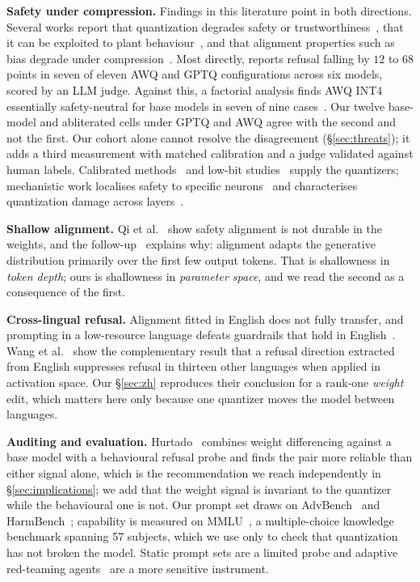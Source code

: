 \documentclass[conference,compsoc,letterpaper]{IEEEtran}
\begin{document}
\textbf{Safety under compression.} Findings in this literature point in both directions. Several works report that quantization degrades safety or trustworthiness~\cite{quantsafety2025,compressedtrust2024,finetunequant2024}, that it can be exploited to plant behaviour~\cite{exploitquant2024}, and that alignment properties such as bias degrade under compression~\cite{bias2026}. Most directly, \cite{qualitynotproxy2026} reports refusal falling by $12$ to $68$ points in seven of eleven AWQ and GPTQ configurations across six models, scored by an LLM judge. Against this, a factorial analysis finds AWQ INT4 essentially safety-neutral for base models in seven of nine cases~\cite{jointtemp2026}. Our twelve base-model and abliterated cells under GPTQ and AWQ agree with the second and not the first. Our cohort alone cannot resolve the disagreement (\S\ref{sec:threats}); it adds a third measurement with matched calibration and a judge validated against human labels. Calibrated methods~\cite{gptq2022,awq2023} and low-bit studies~\cite{qlora2023,lowbitllama3,bf16ordeath2024,kldquant2026} supply the quantizers; mechanistic work localises safety to specific neurons~\cite{safetyneurons2024} and characterises quantization damage across layers~\cite{structure2026}.

\textbf{Shallow alignment.} Qi et al.~\cite{qi2024finetuning} show safety alignment is not durable in the weights, and the follow-up~\cite{qi2025shallow} explains why: alignment adapts the generative distribution primarily over the first few output tokens. That is shallowness in \emph{token depth}; ours is shallowness in \emph{parameter space}, and we read the second as a consequence of the first.

\textbf{Cross-lingual refusal.} Alignment fitted in English does not fully transfer, and prompting in a low-resource language defeats guardrails that hold in English~\cite{yong2023lowresource,deng2024multilingual}. Wang et al.~\cite{wang2025universal} show the complementary result that a refusal direction extracted from English suppresses refusal in thirteen other languages when applied in activation space. Our \S\ref{sec:zh} reproduces their conclusion for a rank-one \emph{weight} edit, which matters here only because one quantizer moves the model between languages.

\textbf{Auditing and evaluation.} Hurtado~\cite{hurtado2026audit} combines weight differencing against a base model with a behavioural refusal probe and finds the pair more reliable than either signal alone, which is the recommendation we reach independently in \S\ref{sec:implications}; we add that the weight signal is invariant to the quantizer while the behavioural one is not. Our prompt set draws on AdvBench~\cite{advbench2023} and HarmBench~\cite{harmbench2024}; capability is measured on MMLU~\cite{mmlu2021}, a multiple-choice knowledge benchmark spanning 57 subjects, which we use only to check that quantization has not broken the model. Static prompt sets are a limited probe and adaptive red-teaming agents~\cite{redteam2026} are a more sensitive instrument.
\end{document}
